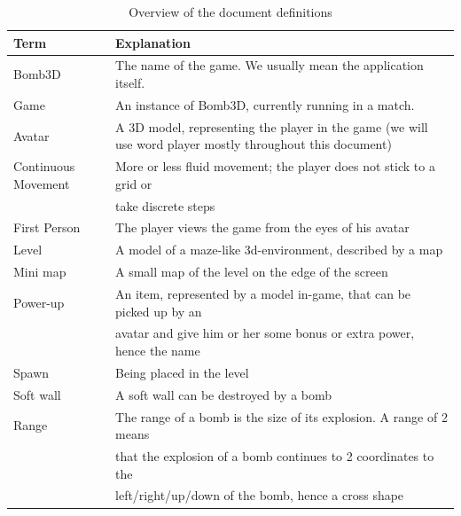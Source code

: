 \begin{table}[h!t!]

    \begin{tabular}{l|l}
        \hline
        \hline
        Term                & Explanation \\
        \hline
        \hline
        Bomb3D              & The name of the game. We usually mean the application itself. \\
        \hline
        Game                & An instance of Bomb3D, currently running in a match. \\ 
        \hline
        Avatar              & A 3D model, representing the player in the game (we will use word player mostly throughout this document) \\
        \hline
        Continuous Movement & More or less fluid movement; the player does not stick to a grid or \\
                            & take discrete steps \\
        \hline
        First Person        & The player views the game from the eyes of his avatar \\
        \hline
        Level               & A model of a maze-like 3d-environment, described by a map \\
        \hline
        Mini map            & A small map of the level on the edge of the screen \\
        \hline
        Power-up            & An item, represented by a model in-game, that can be picked up by an \\
                            & avatar and give him or her some bonus or extra power, hence the name \\
        \hline
        Spawn               & Being placed in the level \\
        \hline
        Soft wall           & A soft wall can be destroyed by a bomb \\
        \hline
        Range               & The range of a bomb is the size of its explosion. A range of 2 means \\
                            & that the explosion of a bomb continues to 2 coordinates to the \\
                            & left/right/up/down of the bomb, hence a cross shape \\
        \hline
        \hline
    \end{tabular}
        \caption{Overview of the document definitions}
        \label{table:definitions}
\end{table}


